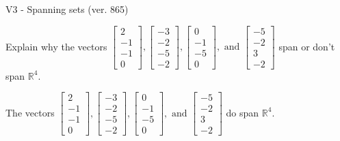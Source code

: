 \begin{exercise}
  \begin{exerciseTitle}V3 - Spanning sets (ver. 865)\end{exerciseTitle}
  \begin{exerciseStatement}
    Explain why the vectors \(\left[\begin{array}{r}
2 \\
-1 \\
-1 \\
0
\end{array}\right] , \left[\begin{array}{r}
-3 \\
-2 \\
-5 \\
-2
\end{array}\right] , \left[\begin{array}{r}
0 \\
-1 \\
-5 \\
0
\end{array}\right] , \text{ and } \left[\begin{array}{r}
-5 \\
-2 \\
3 \\
-2
\end{array}\right]\) span or don't span \(\mathbb{R}^4\). 
	


  \end{exerciseStatement}
  \begin{exerciseAnswer}
   The vectors \(\left[\begin{array}{r}
2 \\
-1 \\
-1 \\
0
\end{array}\right] , \left[\begin{array}{r}
-3 \\
-2 \\
-5 \\
-2
\end{array}\right] , \left[\begin{array}{r}
0 \\
-1 \\
-5 \\
0
\end{array}\right] , \text{ and } \left[\begin{array}{r}
-5 \\
-2 \\
3 \\
-2
\end{array}\right]\) 
  	 do  
	span \(\mathbb{R}^4\).
  


  \end{exerciseAnswer}
\end{exercise}